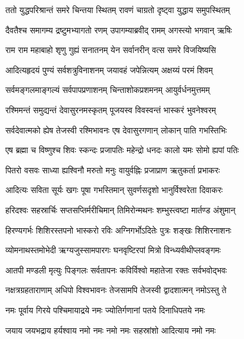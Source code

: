 
\twolineshloka
{ततो युद्धपरिश्रान्तं समरे चिन्तया स्थितम्}
{रावणं चाग्रतो दृष्ट्वा युद्धाय समुपस्थितम्}

\twolineshloka
{दैवतैश्च समागम्य द्रष्टुमभ्यागतो रणम्}
{उपागम्याब्रवीद् रामम् अगस्त्यो भगवान् ऋषिः}

\twolineshloka
{राम राम महाबाहो शृणु गुह्यं सनातनम्}
{येन सर्वानरीन् वत्स समरे विजयिष्यसि}

\twolineshloka
{आदित्यहृदयं पुण्यं सर्वशत्रुविनाशनम्}
{जयावहं जपेन्नित्यम् अक्षय्यं परमं शिवम्}

\twolineshloka
{सर्वमङ्गलमाङ्गल्यं सर्वपापप्रणाशनम्}
{चिन्ताशोकप्रशमनम् आयुर्वर्धनमुत्तमम्}

\twolineshloka
{रश्मिमन्तं समुद्यन्तं देवासुरनमस्कृतम्}
{पूजयस्व विवस्वन्तं भास्करं भुवनेश्वरम्}

\twolineshloka
{सर्वदेवात्मको ह्येष तेजस्वी रश्मिभावनः}
{एष देवासुरगणान् लोकान् पाति गभस्तिभिः}

\twolineshloka
{एष ब्रह्मा च विष्णुश्च शिवः स्कन्दः प्रजापतिः}
{महेन्द्रो धनदः कालो यमः सोमो ह्यपां पतिः}

\twolineshloka
{पितरो वसवः साध्या ह्यश्विनौ मरुतो मनुः}
{वायुर्वह्निः प्रजाप्राण ऋतुकर्ता प्रभाकरः}

\twolineshloka
{आदित्यः सविता सूर्यः खगः पूषा गभस्तिमान्}
{सुवर्णसदृशो भानुर्विश्वरेता दिवाकरः}

\twolineshloka
{हरिदश्वः सहस्रार्चिः सप्तसप्तिर्मरीचिमान्}
{तिमिरोन्मथनः शम्भुस्त्वष्टा मार्तण्ड अंशुमान्}

\twolineshloka
{हिरण्यगर्भः शिशिरस्तपनो भास्करो रविः}
{अग्निगर्भोऽदितेः पुत्रः शङ्खः शिशिरनाशनः}

\twolineshloka
{व्योमनाथस्तमोभेदी ऋग्यजुस्सामपारगः}
{घनवृष्टिरपां मित्रो विन्ध्यवीथीप्लवङ्गमः}

\twolineshloka
{आतपी मण्डली मृत्युः पिङ्गलः सर्वतापनः}
{कविर्विश्वो महातेजा रक्तः सर्वभवोद्भवः}

\twolineshloka
{नक्षत्रग्रहताराणाम् अधिपो विश्वभावनः}
{तेजसामपि तेजस्वी द्वादशात्मन् नमोऽस्तु ते}

\twolineshloka
{नमः पूर्वाय गिरये पश्चिमायाद्रये नमः}
{ज्योतिर्गणानां पतये दिनाधिपतये नमः}

\twolineshloka
{जयाय जयभद्राय हर्यश्वाय नमो नमः}
{नमो नमः सहस्रांशो आदित्याय नमो नमः}


